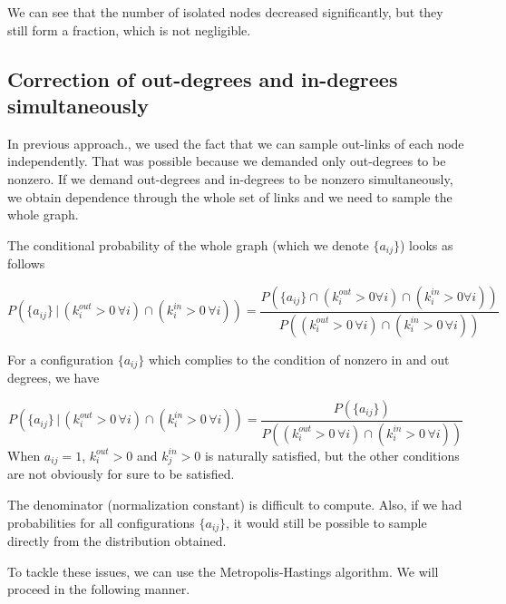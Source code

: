 \documentclass{article}
\begin{document}
We can see that the number of isolated nodes decreased significantly, but they still form a fraction, which is not negligible.

\subsection{Correction of out-degrees and in-degrees simultaneously}
In previous approach., we used the fact that we can sample out-links of each node independently. That was possible because we demanded only out-degrees to be nonzero. If we demand out-degrees and in-degrees to be nonzero simultaneously, we obtain dependence through the whole set of links and we need to sample the whole graph.

The conditional probability of the whole graph (which we denote $\{a_{ij}\}$) looks as follows

\begin{equation}
    P(\{a_{ij}\} \, | \, (k_i^{out} > 0 \, \forall i) \cap (k_i^{in} > 0 \, \forall i )) = \frac{P(\{a_{ij}\} \cap (k_i^{out} > 0 \forall i) \cap (k_i^{in} > 0 \forall i ))}{P((k_i^{out} > 0 \, \forall i) \cap (k_i^{in} > 0 \, \forall i ))}
\end{equation}

For a configuration $\{a_{ij}\}$ which complies to the condition of nonzero in and out degrees, we have

\begin{equation}
    P(\{a_{ij}\} \, | \, (k_i^{out} > 0 \, \forall i) \cap (k_i^{in} > 0 \, \forall i )) = \frac{P(\{a_{ij}\})}{P((k_i^{out} > 0 \, \forall i) \cap (k_i^{in} > 0 \, \forall i ))}
\end{equation}
{\color{red} When $a_{ij}=1$, $ k_i^{out} > 0$ and $k_j^{in} > 0$ is naturally satisfied, but the other conditions are not obviously for sure to be satisfied.}

The denominator (normalization constant) is difficult to compute. Also, if we had probabilities for all configurations $\{a_{ij}\}$, it would still be possible to sample directly from the distribution obtained.

To tackle these issues, we can use the Metropolis-Hastings algorithm. We will proceed in the following manner.
\end{document}

